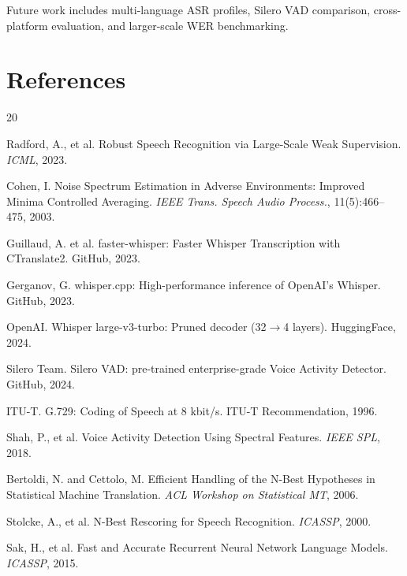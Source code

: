 \documentclass[11pt]{article}
\begin{document}
Future work includes multi-language ASR profiles, Silero VAD comparison, cross-platform
evaluation, and larger-scale WER benchmarking.

\section*{References}

\begin{thebibliography}{20}
\setlength{\itemsep}{0pt}
\setlength{\parsep}{0pt}

Radford, A., et al.
\newblock Robust Speech Recognition via Large-Scale Weak Supervision.
\newblock \textit{ICML}, 2023.

Cohen, I.
\newblock Noise Spectrum Estimation in Adverse Environments: Improved Minima Controlled
Averaging.
\newblock \textit{IEEE Trans. Speech Audio Process.}, 11(5):466--475, 2003.

Guillaud, A. et al.
\newblock faster-whisper: Faster Whisper Transcription with CTranslate2.
\newblock GitHub, 2023.

Gerganov, G.
\newblock whisper.cpp: High-performance inference of OpenAI's Whisper.
\newblock GitHub, 2023.

OpenAI.
\newblock Whisper large-v3-turbo: Pruned decoder (32$\to$4 layers).
\newblock HuggingFace, 2024.

Silero Team.
\newblock Silero VAD: pre-trained enterprise-grade Voice Activity Detector.
\newblock GitHub, 2024.

ITU-T.
\newblock G.729: Coding of Speech at 8 kbit/s.
\newblock ITU-T Recommendation, 1996.

Shah, P., et al.
\newblock Voice Activity Detection Using Spectral Features.
\newblock \textit{IEEE SPL}, 2018.

Bertoldi, N. and Cettolo, M.
\newblock Efficient Handling of the N-Best Hypotheses in Statistical Machine Translation.
\newblock \textit{ACL Workshop on Statistical MT}, 2006.

Stolcke, A., et al.
\newblock N-Best Rescoring for Speech Recognition.
\newblock \textit{ICASSP}, 2000.

Sak, H., et al.
\newblock Fast and Accurate Recurrent Neural Network Language Models.
\newblock \textit{ICASSP}, 2015.

\end{thebibliography}
\end{document}
